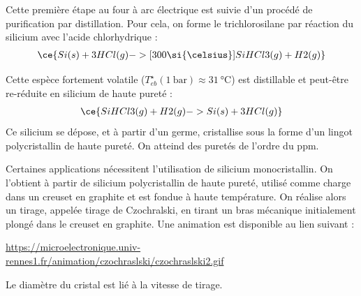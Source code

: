 \documentclass[a4paper]{book}
\begin{document}
Cette première étape au four à arc électrique est suivie d'un procédé de purification par distillation. Pour cela, on forme le trichlorosilane  par réaction du silicium avec l'acide chlorhydrique : 
\begin{align*}
\ce{Si(s) + 3HCl (g) ->[300 \si{\celsius}] SiHCl3(g) + H2(g)}
\end{align*}

Cette espèce fortement volatile ($T_{eb}^\star (1 ~ \si{\bar}) \approx 31 ~ \si{\celsius}$) est distillable et peut-être re-réduite en silicium de haute pureté : 
\begin{align*}
\ce{SiHCl3(g) + H2(g) -> Si(s) + 3HCl(g)}
\end{align*}
Ce silicium se dépose, et à partir d'un germe, cristallise sous la forme d'un lingot polycristallin de haute pureté. On atteind des puretés de l'ordre du ppm.


Certaines applications nécessitent l'utilisation de silicium monocristallin. On l'obtient à partir de silicium polycristallin de haute pureté, utilisé comme charge dans un creuset en graphite et est fondue à haute température. On réalise alors un tirage, appelée tirage de Czochralski, en tirant un bras mécanique initialement plongé dans le creuset en graphite. Une animation est disponible au lien suivant : 
\begin{center}
\url{https://microelectronique.univ-rennes1.fr/animation/czochraslski/czochraslski2.gif}
\end{center}

Le diamètre du cristal est lié à la vitesse de tirage.
\end{document}
